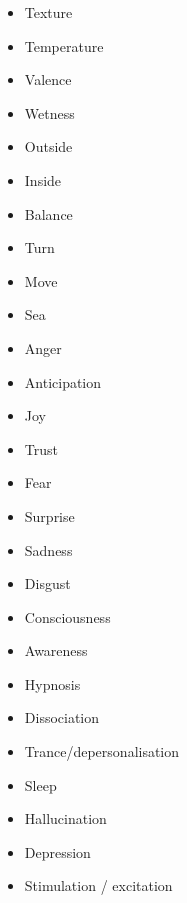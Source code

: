 \begin{itemize}
\item   Texture 

\item   Temperature 

\item   Valence 

\item   Wetness 

\item   Outside 

\item   Inside 

\item   Balance 

\item   Turn 

\item   Move 

\item   Sea 

\item   Anger 

\item   Anticipation 

\item   Joy 

\item   Trust 

\item   Fear 

\item   Surprise 

\item   Sadness 

\item   Disgust 

\item   Consciousness 

\item   Awareness 

\item   Hypnosis 

\item   Dissociation 

\item   Trance/depersonalisation 

\item   Sleep 

\item   Hallucination 

\item   Depression 

\item   Stimulation / excitation 


\end{itemize}
